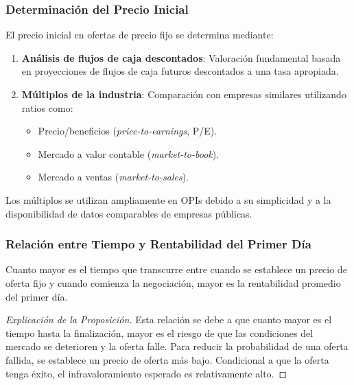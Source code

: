 \subsubsection{Determinación del Precio Inicial}

El precio inicial en ofertas de precio fijo se determina mediante:

\begin{enumerate}
\item \textbf{Análisis de flujos de caja descontados}: Valoración fundamental basada en proyecciones de flujos de caja futuros descontados a una tasa apropiada.
\item \textbf{Múltiplos de la industria}: Comparación con empresas similares utilizando ratios como:
   \begin{itemize}
   \item Precio/beneficios (\textit{price-to-earnings}, P/E).
   \item Mercado a valor contable (\textit{market-to-book}).
   \item Mercado a ventas (\textit{market-to-sales}).
   \end{itemize}
\end{enumerate}

Los múltiplos se utilizan ampliamente en OPIs debido a su simplicidad y a la disponibilidad de datos comparables de empresas públicas.

\subsubsection{Relación entre Tiempo y Rentabilidad del Primer Día}

\begin{proposicion}
Cuanto mayor es el tiempo que transcurre entre cuando se establece un precio de oferta fijo y cuando comienza la negociación, mayor es la rentabilidad promedio del primer día.
\end{proposicion}

\begin{proof}[Explicación de la Proposición]
Esta relación se debe a que cuanto mayor es el tiempo hasta la finalización, mayor es el riesgo de que las condiciones del mercado se deterioren y la oferta falle. Para reducir la probabilidad de una oferta fallida, se establece un precio de oferta más bajo. Condicional a que la oferta tenga éxito, el infravaloramiento esperado es relativamente alto.
\end{proof}

